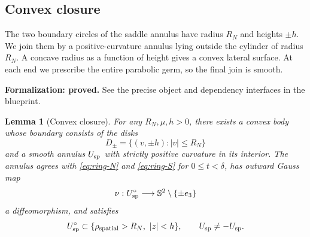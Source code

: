 \documentclass[11pt]{amsart}
\newtheorem{lemma}[theorem]{Lemma}
\theoremstyle{definition}
\theoremstyle{remark}
\numberwithin{equation}{section}
\begin{document}
\subsection{Convex closure}\label{sec:model-convex}
The two boundary circles of the saddle annulus have radius $R_N$
and heights $\pm h$. We join them by a positive-curvature annulus
lying outside the cylinder of radius $R_N$. A concave radius as a
function of height gives a convex lateral surface. At each end we
prescribe the entire parabolic germ, so the final join is smooth.

\par\noindent\textbf{Formalization: proved.} See the precise object and dependency interfaces in the blueprint.\par
\begin{lemma}[Convex closure]\label{lem:convex}
For any $R_N,\mu,h>0$, there exists a convex body whose boundary
consists of the disks
\[
 D_\pm=\{(v,\pm h):|v|\le R_N\}
\]
and a smooth annulus $U_{\rm sp}$ with strictly positive curvature
in its interior. The annulus agrees with \eqref{eq:ring-N} and
\eqref{eq:ring-S} for $0\le t<\delta$, has outward Gauss map
\begin{equation}\label{eq:convex-gauss}
 \nu:U_{\rm sp}^{\circ}\longrightarrow
            \mathbb S^2\setminus\{\pm e_3\}
\end{equation}
a diffeomorphism, and satisfies
\begin{equation}\label{eq:convex-exterior}
 U_{\rm sp}^{\circ}\subset
      \{\rho_{\rm spatial}>R_N,\ |z|<h\},
 \qquad U_{\rm sp}\ne -U_{\rm sp}.
\end{equation}
\end{lemma}
\end{document}

